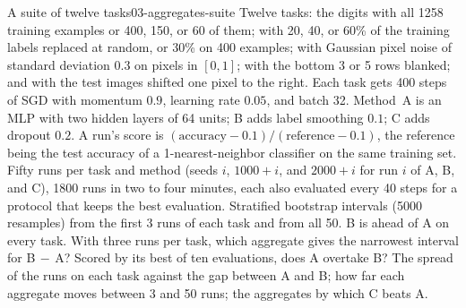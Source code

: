 \begin{refsection}
\begin{lab}{A suite of twelve tasks}{03-aggregates-suite}\label{lab:aggregates:suite}
 Twelve tasks: the digits with all 1258 training examples or 400, 150, or 60 of them; with 20, 40, or 60\% of the training labels replaced at random, or 30\% on 400 examples; with Gaussian pixel noise of standard deviation $0.3$ on pixels in $[0,1]$; with the bottom 3 or 5 rows blanked; and with the test images shifted one pixel to the right. Each task gets 400 steps of SGD with momentum $0.9$, learning rate $0.05$, and batch 32. Method~A is an MLP with two hidden layers of 64 units; B adds label smoothing $0.1$; C adds dropout $0.2$. A run's score is $(\text{accuracy}-0.1)/(\text{reference}-0.1)$, the reference being the test accuracy of a 1-nearest-neighbor classifier on the same training set. Fifty runs per task and method (seeds $i$, $1000+i$, and $2000+i$ for run $i$ of A, B, and C), 1800 runs in two to four minutes, each also evaluated every 40 steps for a protocol that keeps the best evaluation. Stratified bootstrap intervals (5000 resamples) from the first 3 runs of each task and from all 50.
 B is ahead of A on every task. With three runs per task, which aggregate gives the narrowest interval for B$\,-\,$A? Scored by its best of ten evaluations, does A overtake B?
 The spread of the runs on each task against the gap between A and B; how far each aggregate moves between 3 and 50 runs; the aggregates by which C beats A.
\end{lab}


\end{refsection}
